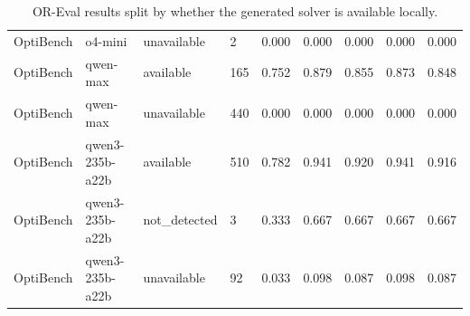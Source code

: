 \begin{table}[t]
\begin{tabular}{lllllllll}
OptiBench & o4-mini & unavailable & 2 & 0.000 & 0.000 & 0.000 & 0.000 & 0.000 \\
OptiBench & qwen-max & available & 165 & 0.752 & 0.879 & 0.855 & 0.873 & 0.848 \\
OptiBench & qwen-max & unavailable & 440 & 0.000 & 0.000 & 0.000 & 0.000 & 0.000 \\
OptiBench & qwen3-235b-a22b & available & 510 & 0.782 & 0.941 & 0.920 & 0.941 & 0.916 \\
OptiBench & qwen3-235b-a22b & not\_detected & 3 & 0.333 & 0.667 & 0.667 & 0.667 & 0.667 \\
OptiBench & qwen3-235b-a22b & unavailable & 92 & 0.033 & 0.098 & 0.087 & 0.098 & 0.087 \\
\bottomrule
\end{tabular}
\caption{OR-Eval results split by whether the generated solver is available locally.}
\label{tab:or_eval_solver_availability_outcomes}
\end{table}

